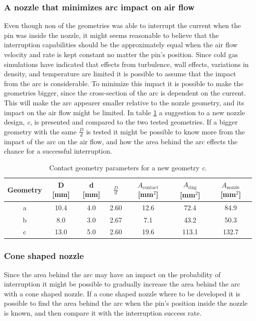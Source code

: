 \documentclass[10pt,a4paper,twoside]{article}
\begin{document}
\subsubsection{A nozzle that minimizes arc impact on air flow}
Even though non of the geometries was able to interrupt the current when the pin was inside the nozzle, it might seems reasonable to believe that the interruption capabilities should be the approximately equal when the air flow velocity and rate is kept constant no matter the pin's position. Since cold gas simulations have indicated that effects from turbulence, wall effects, variations in density, and temperature are limited it is possible to assume that the impact from the arc is considerable. To minimize this impact it is possible to make the geometries bigger, since the cross-section of the arc is dependent on the current. This will make the arc appearer smaller relative to the nozzle geometry, and its impact on the air flow might be limited. In table \ref{tab:contGeoParaNew} a suggestion to a new nozzle design, \textit{c}, is presented and compared to the two tested geometries. If a bigger geometry with the same $\frac{D}{d}$ is tested it might be possible to know more from the impact of the arc on the air flow, and how the area behind the arc effects the chance for a successful interruption.

\begin{table}[H]
\center
\caption{Contact geometry parameters for a new geometry \textit{c}.}
 \begin{tabular}{|c|c|c|c|c|c|c|}
\hline 
Geometry & D [mm] & d [mm] & $\frac{D}{d}$ & $A_\mathrm{{contact}}$ [mm$^2$] & $A_\mathrm{{ring}}$ [mm$^2$] & $A_\mathrm{{nozzle}}$ [mm$^2$] \\ 
\hline 
a & 10.4 & 4.0 & 2.60 & 12.6 & 72.4 & 84.9 \\ 
\hline 
b & 8.0 & 3.0 & 2.67 & 7.1 & 43.2 & 50.3 \\ 
\hline 
c & 13.0 & 5.0 & 2.60 & 19.6 & 113.1 & 132.7 \\ 
\hline
\end{tabular} 
\label{tab:contGeoParaNew}
\end{table}

\subsubsection{Cone shaped nozzle}
Since the area behind the arc may have an impact on the probability of interruption it might be possible to gradually increase the area behind the arc with a cone shaped nozzle. If a cone shaped nozzle where to be developed it is possible to find the area behind the arc when the pin's position inside the nozzle is known, and then compare it with the interruption success rate.
\end{document}
